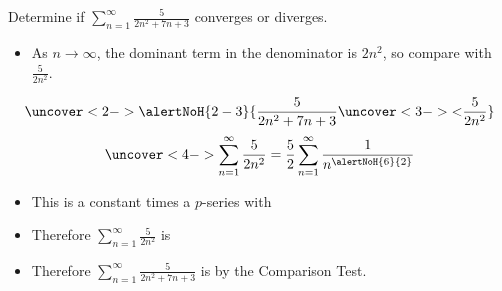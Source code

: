 \begin{frame}
\begin{example}
Determine if $\sum_{n=1}^\infty \frac{5}{2n^2+7n+3}$ converges or diverges.
\begin{itemize}
\item<2->  As $n\to \infty$, the dominant term in the denominator is $2n^2$, so compare with $\frac{5}{2n^2}$.
\end{itemize}
\abovedisplayskip=0pt
\belowdisplayskip=0pt
\[
\uncover<2->{%
\alertNoH{ 2-3}{%
\frac{5}{2n^2+7n+3} \uncover<3->{<} \frac{5}{2n^2}%
}}%
\]
\abovedisplayskip=0pt
\belowdisplayskip=0pt
\[
\uncover<4->{%
\sum_{n=1}^\infty \frac{5}{2n^2} = \frac{5}{2}\sum_{n=1}^\infty \frac{1}{n^{\alertNoH{ 6}{2}}}%
}%
\]
\begin{itemize}
\item<5->  This is a constant times a $p$-series with 
\item<7-| alert@7-8>  Therefore $\sum_{n=1}^\infty \frac{5}{2n^2}$ is 
\item<9-| alert@9-10>  Therefore $\sum_{n=1}^\infty \frac{5}{2n^2+7n+3}$ is  by the Comparison Test.
\end{itemize}
\end{example}
\end{frame}
